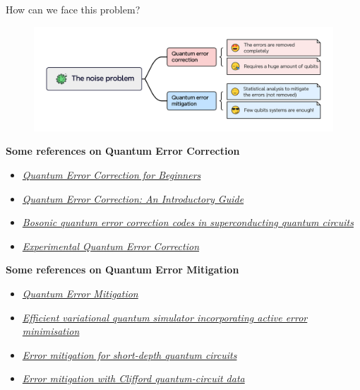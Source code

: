 \documentclass[aspectratio=169, 8pt, xcolor={svgnames}, hyperref={linkcolor=black}]{beamer}
\begin{document}
\begin{frame}{How can we face this problem?}
\begin{figure}
    \includegraphics[width=1\textwidth]{figures/qem_qec.pdf}
\end{figure}
\vspace{-0.5cm}
\begin{multicols}{2}
\small
\textbf{Some references on Quantum Error Correction}
\begin{itemize}[noitemsep]
\item[\faBook] \href{https://arxiv.org/abs/0905.2794}{\textit{Quantum Error Correction for Beginners}}
\item[\faBook] \href{https://arxiv.org/abs/1907.11157}{\textit{Quantum Error Correction: An Introductory Guide
}}
\item[\faBook] \href{https://arxiv.org/abs/2010.08699}{\textit{Bosonic quantum error correction codes in superconducting quantum circuits
}}
\item[\faBook] \href{https://arxiv.org/abs/quant-ph/9802018}{\textit{Experimental Quantum Error Correction}}
\end{itemize}
\textbf{Some references on Quantum Error Mitigation}
\begin{itemize}[noitemsep]
\item[\faBook] \href{https://arxiv.org/abs/2210.00921}{\textit{Quantum Error Mitigation}}
\item[\faBook] \href{https://arxiv.org/abs/1611.09301}{\textit{Efficient variational quantum simulator incorporating active error minimisation
}}
\item[\faBook] \href{https://arxiv.org/abs/1612.02058}{\textit{Error mitigation for short-depth quantum circuits
}}
\item[\faBook] \href{https://arxiv.org/abs/2005.10189}{\textit{Error mitigation with Clifford quantum-circuit data}}
\end{itemize}

\end{multicols}
\end{frame}
\end{document}
